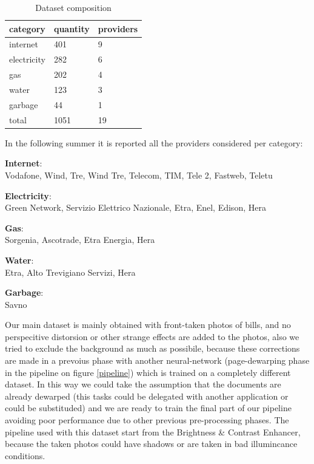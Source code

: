 \documentclass[10pt,twocolumn,letterpaper]{article}
\begin{document}
\begin{table}[!h]
	\begin{center}
		\begin{tabular}{lll}
			\hline
			category    & quantity & providers \\ \hline
			internet    & 401      & 9         \\
			electricity & 282      & 6         \\
			gas         & 202      & 4         \\
			water       & 123      & 3         \\
			garbage     & 44       & 1         \\ \hline
			total       & 1051     & 19        \\ \hline
		\end{tabular}
	\end{center}
	\label{dataset-table}
	\caption{Dataset composition}
\end{table}

In the following summer it is reported all the providers considered per category:\\

\begin{itemize}
\end{itemize}

Our main dataset is mainly obtained with front-taken photos of bills, and no perspecitive distorsion or other strange effects are added to the photos, also we tried to exclude the background as much as possibile, because these corrections are made in a prevoius phase with another neural-network (page-dewarping phase in the pipeline on figure \ref{pipeline}) which is trained on a completely different dataset. In this way we could take the assumption that the documents are already dewarped (this tasks could be delegated with another application or could be substituded) and we are ready to train the final part of our pipeline avoiding poor performance due to other previous pre-processing phases. The pipeline used with this dataset start from the Brightness \& Contrast Enhancer, because the taken photos could have shadows or are taken in bad illumincance conditions. \\
\end{document}
